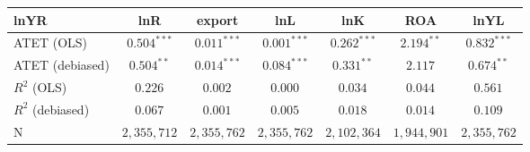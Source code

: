 \begin{tabular}{l*{6}{c}}
\hline\hline
 lnYR & lnR & export & lnL & lnK & ROA & lnYL \\
\hline
ATET (OLS) & $0.504^{***}$ & $0.011^{***}$ & $0.001^{***}$ & $0.262^{***}$ & $2.194^{**}$ & $0.832^{***}$ \\
ATET (debiased) & $0.504^{**}$ & $0.014^{***}$ & $0.084^{***}$ & $0.331^{**}$ & $2.117^{}$ & $0.674^{**}$ \\
\addlinespace $ R^2$ (OLS) & $0.226^{}$ & $0.002^{}$ & $0.000^{}$ & $0.034^{}$ & $0.044^{}$ & $0.561^{}$ \\
$ R^2$ (debiased) & $0.067^{}$ & $0.001^{}$ & $0.005^{}$ & $0.018^{}$ & $0.014^{}$ & $0.109^{}$ \\
N & $2,355,712$ & $2,355,762$ & $2,355,762$ & $2,102,364$ & $1,944,901$ & $2,355,762$ \\
\hline\hline
\end{tabular}
